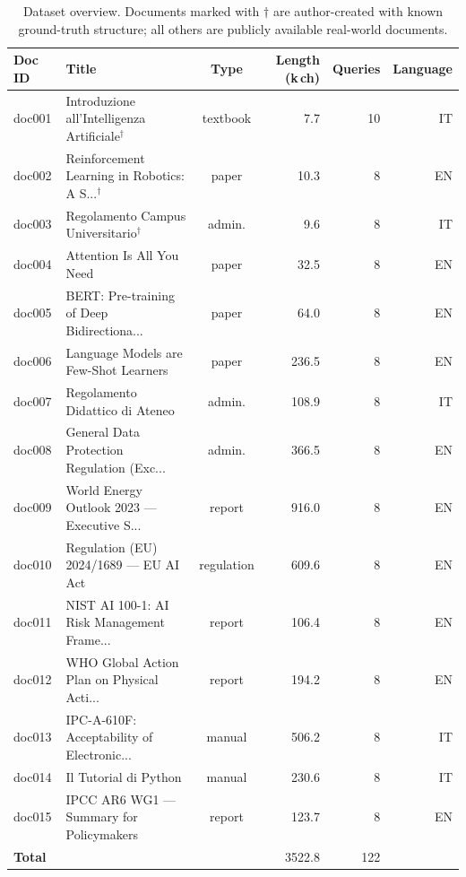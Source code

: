 \begin{table}[t]
\centering
\small
\caption{Dataset overview. Documents marked with $\dagger$ are author-created
 with known ground-truth structure; all others are publicly available real-world documents.}
\label{tab:dataset}
\begin{tabular}{llcrrr}
\toprule
\textbf{Doc ID} & \textbf{Title} & \textbf{Type} & \textbf{Length (k\,ch)} & \textbf{Queries} & \textbf{Language} \\
\midrule
doc001 & Introduzione all'Intelligenza Artificiale$^\dagger$ & textbook & 7.7 & 10 & IT \\
doc002 & Reinforcement Learning in Robotics: A S...$^\dagger$ & paper & 10.3 & 8 & EN \\
doc003 & Regolamento Campus Universitario$^\dagger$ & admin. & 9.6 & 8 & IT \\
doc004 & Attention Is All You Need & paper & 32.5 & 8 & EN \\
doc005 & BERT: Pre-training of Deep Bidirectiona... & paper & 64.0 & 8 & EN \\
doc006 & Language Models are Few-Shot Learners & paper & 236.5 & 8 & EN \\
doc007 & Regolamento Didattico di Ateneo & admin. & 108.9 & 8 & IT \\
doc008 & General Data Protection Regulation (Exc... & admin. & 366.5 & 8 & EN \\
doc009 & World Energy Outlook 2023 — Executive S... & report & 916.0 & 8 & EN \\
doc010 & Regulation (EU) 2024/1689 — EU AI Act & regulation & 609.6 & 8 & EN \\
doc011 & NIST AI 100-1: AI Risk Management Frame... & report & 106.4 & 8 & EN \\
doc012 & WHO Global Action Plan on Physical Acti... & report & 194.2 & 8 & EN \\
doc013 & IPC-A-610F: Acceptability of Electronic... & manual & 506.2 & 8 & IT \\
doc014 & Il Tutorial di Python & manual & 230.6 & 8 & IT \\
doc015 & IPCC AR6 WG1 — Summary for Policymakers & report & 123.7 & 8 & EN \\
\midrule
\textbf{Total} & & & 3522.8 & 122 & \\
\bottomrule
\end{tabular}
\end{table}
